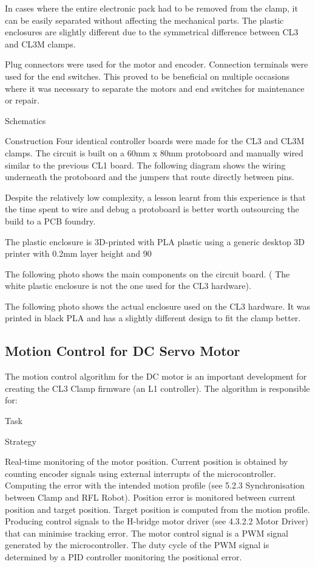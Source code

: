 \begin{itemize}
In cases where the entire electronic pack had to be removed from the clamp, it can be easily separated without affecting the mechanical parts. The plastic enclosures are slightly different due to the symmetrical difference between CL3 and CL3M clamps. 

Plug connectors were used for the motor and encoder. Connection terminals were used for the end switches. This proved to be beneficial on multiple occasions where it was necessary to separate the motors and end switches for maintenance or repair.

Schematics

Construction
Four identical controller boards were made for the CL3 and CL3M clamps. The circuit is built on a 60mm x 80mm protoboard and manually wired similar to the previous CL1 board. The following diagram shows the wiring underneath the protoboard and the jumpers that route directly between pins.

Despite the relatively low complexity, a lesson learnt from this experience is that the time spent to wire and debug a protoboard is better worth outsourcing the build to a PCB foundry. 

The plastic enclosure is 3D-printed with PLA plastic using a generic desktop 3D printer with 0.2mm layer height and 90%

The following photo shows the main components on the circuit board. ( The white plastic enclosure is not the one used for the CL3 hardware). 

The following photo shows the actual enclosure used on the CL3 hardware. It was printed in black PLA and has a slightly different design to fit the clamp better.

\subsection{Motion Control for DC Servo Motor}
The motion control algorithm for the DC motor is an important development for creating the CL3 Clamp firmware (an L1 controller). The algorithm is responsible for:

Task

Strategy

Real-time monitoring of the motor position.
Current position is obtained by counting encoder signals using external interrupts of the microcontroller.
Computing the error with the intended motion profile (see 5.2.3 Synchronisation between Clamp and RFL Robot).
Position error is monitored between current position and target position. 
Target position is computed from the motion profile.
Producing control signals to the H-bridge motor driver (see 4.3.2.2 Motor Driver) that can minimise tracking error. 
The motor control signal is a PWM signal generated by the microcontroller. 
The duty cycle of the PWM signal is determined by a PID controller monitoring the positional error.


\end{itemize}
